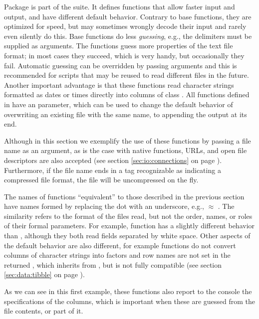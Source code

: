 \documentclass[krantz2]{krantz}\usepackage{knitr}
\begin{document}
Package  is part of the  suite. It defines functions that allow faster input and output, and have different default behavior. Contrary to base \Rlang functions, they are optimized for speed, but may sometimes wrongly decode their input and rarely even silently do this. Base \Rlang functions do less \emph{guessing}, e.g., the delimiters must be supplied as arguments. The  functions guess more properties of the text file format; in most cases they succeed, which is very handy, but occasionally they fail. Automatic guessing can be overridden by passing arguments and this is recommended for scripts that may be reused to read different files in the future. Another important advantage is that these functions read character strings formatted as dates or times directly into columns of class . All  functions defined in  have an  parameter, which can be used to change the default behavior of overwriting an existing file with the same name, to appending the output at its end.

Although in this section we exemplify the use of these functions by passing a file name as an argument, as is the case with \Rlang native functions, URLs, and open file descriptors are also accepted (see section \ref{sec:io:connections} on page \pageref{sec:io:connections}). Furthermore, if the file name ends in a tag recognizable as indicating a compressed file format, the file will be uncompressed on the fly.

\begin{warningbox}
The names of functions ``equivalent'' to those described in the previous section have names formed by replacing the dot with an underscore, e.g.,   $\approx$ . The similarity refers to the format of the files read, but not the order, names, or roles of their formal parameters. For example, function  has a slightly different behavior than , although they both read fields separated by white space. Other aspects of the default behavior are also different, for example  functions do not convert columns of character strings into factors and row names are not set in the returned , which inherits from , but is not fully compatible (see section \ref{sec:data:tibble} on page \pageref{sec:data:tibble}).
\end{warningbox}

As we can see in this first example, these functions also report to the console the specifications of the columns, which is important when these are guessed from the file contents, or part of it.
\end{document}
